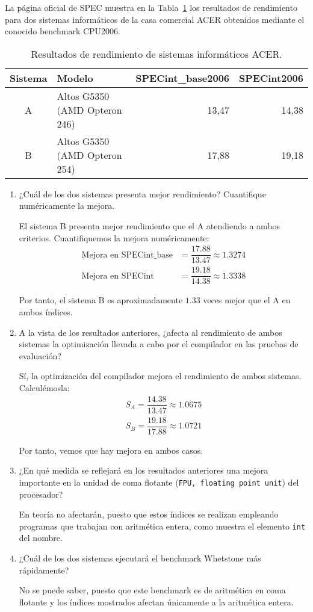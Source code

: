 \begin{ejercicio}\label{ej:4.9}
La página oficial de SPEC muestra en la Tabla~\ref{tab:ej:4.9} los resultados de rendimiento para dos sistemas informáticos de la casa comercial ACER obtenidos mediante el conocido benchmark CPU2006.
\begin{table}[h]
\centering
\begin{tabular}{@{}clrr@{}}
\toprule
Sistema & Modelo & SPECint\_base2006 & SPECint2006 \\ \midrule
A & Altos G5350 (AMD Opteron 246) & 13,47 & 14,38 \\
B & Altos G5350 (AMD Opteron 254) & 17,88 & 19,18 \\ \bottomrule
\end{tabular}
\caption{Resultados de rendimiento de sistemas informáticos ACER.}
\label{tab:ej:4.9}
\end{table}
\begin{enumerate}
    \item ¿Cuál de los dos sistemas presenta mejor rendimiento? Cuantifique numéricamente la mejora.
    
    El sistema B presenta mejor rendimiento que el A atendiendo a ambos criterios. Cuantifiquemos la mejora numéricamente:
    \begin{align*}
        \text{Mejora en SPECint\_base} &= \dfrac{17.88}{13.47} \approx 1.3274\\
        \text{Mejora en SPECint} &= \dfrac{19.18}{14.38} \approx 1.3338
    \end{align*}

    Por tanto, el sistema B es aproximadamente $1.33$ veces mejor que el A en ambos índices.
    \item A la vista de los resultados anteriores, ¿afecta al rendimiento de ambos sistemas la optimización llevada a cabo por el compilador en las pruebas de evaluación?
    
    Sí, la optimización del compilador mejora el rendimiento de ambos sistemas. Calculémosla:
    \begin{align*}
        S_A = \dfrac{14.38}{13.47} \approx 1.0675\\
        S_B = \dfrac{19.18}{17.88} \approx 1.0721
    \end{align*}

    Por tanto, vemos que hay mejora en ambos casos.
    \item ¿En qué medida se reflejará en los resultados anteriores una mejora importante en la unidad de coma flotante (\verb|FPU, floating point unit|) del procesador?
    
    En teoría no afectarán, puesto que estos índices se realizan empleando programas que trabajan con aritmética entera, como muestra el elemento \verb|int| del nombre.
    \item ¿Cuál de los dos sistemas ejecutará el benchmark Whetstone más rápidamente?
    
    No se puede saber, puesto que este benchmark es de aritmética en coma flotante y los índices mostrados afectan únicamente a la aritmética entera.
\end{enumerate}
\end{ejercicio}
